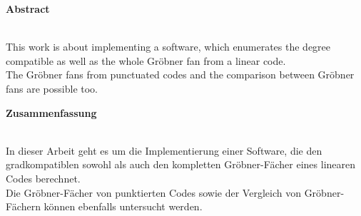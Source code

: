 

\begin{center}
\large \textbf{Abstract} \\
~\\ %
\end{center}
This work is about implementing a software, which enumerates the degree compatible as well as the whole Gröbner fan from a linear code. \\The Gröbner fans from punctuated codes and the comparison between Gröbner fans are possible too.

\vfill %
\begin{center}
\large \textbf{Zusammenfassung} \\
~\\ %
\end{center}
In dieser Arbeit geht es um die Implementierung einer Software, die den gradkompatiblen sowohl als auch den kompletten Gröbner-Fächer eines linearen Codes berechnet. \\Die Gröbner-Fächer von punktierten Codes sowie der Vergleich von Gröbner-Fächern können ebenfalls untersucht werden. 